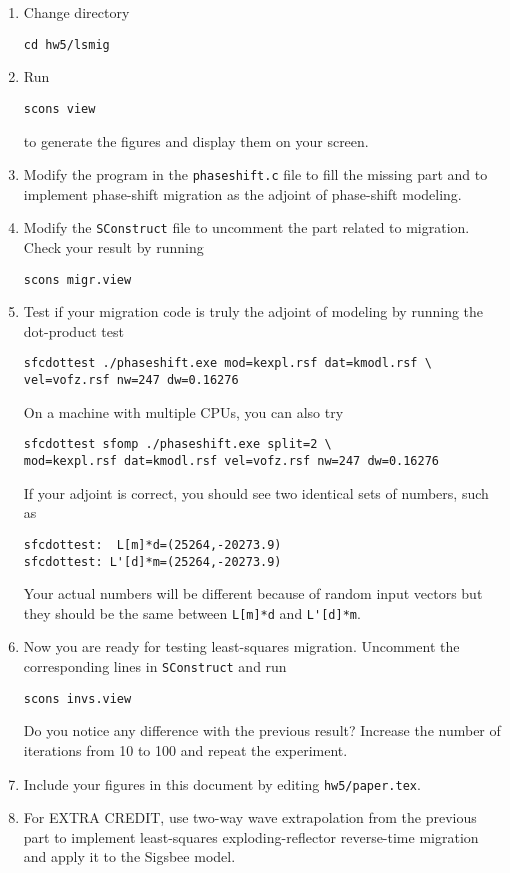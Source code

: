 \begin{enumerate}
\begin{enumerate}
\item Change directory 
\begin{verbatim}
cd hw5/lsmig
\end{verbatim}
\item Run
\begin{verbatim}
scons view
\end{verbatim}
to generate the figures and display them on your screen.
\item Modify the program in the \texttt{phaseshift.c} file to fill the missing part and to implement phase-shift migration as the adjoint of phase-shift modeling. 
\item Modify the \texttt{SConstruct} file to uncomment the part related to migration. Check your result by running
\begin{verbatim}
scons migr.view
\end{verbatim}
\item Test if your migration code is truly the adjoint of modeling by running the dot-product test
\begin{verbatim}
sfcdottest ./phaseshift.exe mod=kexpl.rsf dat=kmodl.rsf \
vel=vofz.rsf nw=247 dw=0.16276
\end{verbatim}
On a machine with multiple CPUs, you can also try
\begin{verbatim}
sfcdottest sfomp ./phaseshift.exe split=2 \
mod=kexpl.rsf dat=kmodl.rsf vel=vofz.rsf nw=247 dw=0.16276
\end{verbatim}
If your adjoint is correct, you should see two identical sets of numbers, such as
\begin{verbatim}
sfcdottest:  L[m]*d=(25264,-20273.9)
sfcdottest: L'[d]*m=(25264,-20273.9)
\end{verbatim}
Your actual numbers will be different because of random input vectors but they should be the same between \verb+L[m]*d+ and \verb+L'[d]*m+.
\item Now you are ready for testing least-squares migration. Uncomment the corresponding lines in \texttt{SConstruct} and run
\begin{verbatim}
scons invs.view
\end{verbatim}
Do you notice any difference with the previous result? Increase the
number of iterations from 10 to 100 and repeat the experiment.  
\item Include your figures in this document by 
  editing \texttt{hw5/paper.tex}.

\item For EXTRA CREDIT, use two-way wave extrapolation from the
  previous part to implement least-squares exploding-reflector
  reverse-time migration and apply it to the Sigsbee model.
  
\end{enumerate}

\lstset{language=python,numbers=left,numberstyle=\tiny,showstringspaces=false}


\lstset{language=c,numbers=left,numberstyle=\tiny,showstringspaces=false}


\end{enumerate}

